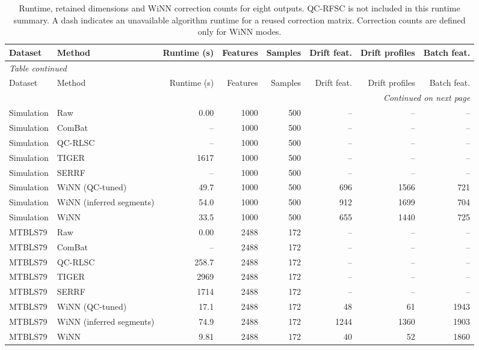 \begin{landscape}
\scriptsize
\begin{longtable}{llrrrrrr}
\caption{Runtime, retained dimensions and WiNN correction counts for eight outputs. QC-RFSC is not included in this runtime summary. A dash indicates an unavailable algorithm runtime for a reused correction matrix. Correction counts are defined only for WiNN modes.}\label{tab:supp_runtime}\\
\toprule
Dataset & Method & Runtime (s) & Features & Samples & Drift feat. & Drift profiles & Batch feat. \\
\midrule
\endfirsthead
\multicolumn{8}{l}{\textit{Table \thetable{} continued}}\\
\toprule
Dataset & Method & Runtime (s) & Features & Samples & Drift feat. & Drift profiles & Batch feat. \\
\midrule
\endhead
\midrule
\multicolumn{8}{r}{\textit{Continued on next page}}\\
\endfoot
\bottomrule
\endlastfoot
Simulation & Raw & 0.00 & 1000 & 500 & -- & -- & -- \\
Simulation & ComBat & -- & 1000 & 500 & -- & -- & -- \\
Simulation & QC-RLSC & -- & 1000 & 500 & -- & -- & -- \\
Simulation & TIGER & 1617 & 1000 & 500 & -- & -- & -- \\
Simulation & SERRF & -- & 1000 & 500 & -- & -- & -- \\
Simulation & WiNN (QC-tuned) & 49.7 & 1000 & 500 & 696 & 1566 & 721 \\
Simulation & WiNN (inferred segments) & 54.0 & 1000 & 500 & 912 & 1699 & 704 \\
Simulation & WiNN & 33.5 & 1000 & 500 & 655 & 1440 & 725 \\
MTBLS79 & Raw & 0.00 & 2488 & 172 & -- & -- & -- \\
MTBLS79 & ComBat & -- & 2488 & 172 & -- & -- & -- \\
MTBLS79 & QC-RLSC & 258.7 & 2488 & 172 & -- & -- & -- \\
MTBLS79 & TIGER & 2969 & 2488 & 172 & -- & -- & -- \\
MTBLS79 & SERRF & 1714 & 2488 & 172 & -- & -- & -- \\
MTBLS79 & WiNN (QC-tuned) & 17.1 & 2488 & 172 & 48 & 61 & 1943 \\
MTBLS79 & WiNN (inferred segments) & 74.9 & 2488 & 172 & 1244 & 1360 & 1903 \\
MTBLS79 & WiNN & 9.81 & 2488 & 172 & 40 & 52 & 1860 \\

\end{longtable}
\end{landscape}
